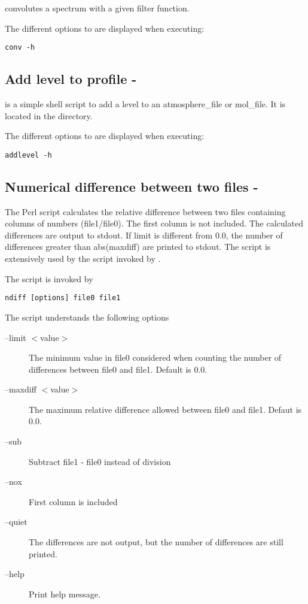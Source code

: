  convolutes a spectrum with a given filter function.

The different options to  are displayed when executing:

\begin{verbatim}
conv -h
\end{verbatim}


\subsection{Add level to profile - }

 is a simple shell script to add a level to 
an atmosphere\_file or mol\_file. It is located in the  directory.

The different options to  are displayed 
when executing:

\begin{verbatim}
addlevel -h
\end{verbatim}

\subsection{Numerical difference between two files -}
The Perl script  calculates the relative difference between two files
containing columns of numbers (file1/file0). The first column is
not included. The calculated differences are output to stdout.
If limit is different from 0.0, the number of differences greater
than abs(maxdiff) are printed to stdout. The  script is
extensively used by the  script invoked by .

The  script is invoked by
  \begin{Verbatim}[fontsize=\footnotesize]
      ndiff [options] file0 file1
  \end{Verbatim}
The script understands the following options
\begin{description}
   \item[--limit $<$value$>$]     The minimum value in file0 considered when
                                  counting the number of differences between file0
                                  and file1. Default is 0.0.
   \item[--maxdiff $<$value$>$]   The maximum relative difference allowed between
                                  file0 and file1. Defaut is 0.0.
   \item[--sub]                   Subtract file1 - file0 instead of division
   \item[--nox]                   First column is included
   \item[--quiet]                 The differences are not output, but the number of
                                  differences are still printed.
   \item[--help]                  Print help message.
\end{description}


